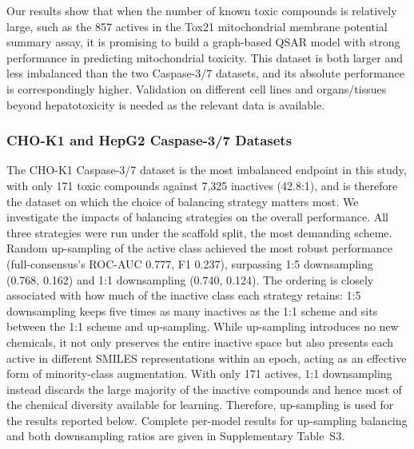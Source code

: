 \documentclass[letterpaper]{article}
\begin{document}
Our results show that when the number of known toxic compounds is relatively large, such as the 857 actives in the Tox21 mitochondrial membrane potential summary assay, it is promising to build a graph-based QSAR model with strong performance in predicting mitochondrial toxicity. This dataset is both larger and less imbalanced than the two Caspase-3/7 datasets, and its absolute performance is
correspondingly higher. Validation on different cell lines and organs/tissues beyond hepatotoxicity is needed as the relevant data is available.

\subsubsection*{CHO-K1 and HepG2 Caspase-3/7 Datasets}

The CHO-K1 Caspase-3/7 dataset is the most imbalanced endpoint in this study, with only 171 toxic compounds against 7,325 inactives (42.8:1), and is therefore the dataset on which the choice of balancing strategy matters most. We investigate the impacts of balancing strategies on the overall performance. All three strategies were run under the scaffold split, the most demanding scheme. Random up-sampling of the active class achieved the most robust performance (full-consensus's ROC-AUC 0.777, F1 0.237), surpassing 1:5
downsampling (0.768, 0.162) and 1:1 downsampling (0.740, 0.124). The ordering is closely associated with how much of the inactive class each strategy retains: 1:5 downsampling keeps five times as many inactives as the 1:1
scheme and sits between the 1:1 scheme and up-sampling. While up-sampling introduces no new chemicals, it not only preserves the entire inactive space but also presents each active in different SMILES representations within an epoch, acting as an effective form of
minority-class augmentation. With only 171 actives, 1:1 downsampling instead discards the large majority of the inactive compounds and hence most of the chemical diversity available for learning.
Therefore, up-sampling is used for the results reported below. Complete per-model results for up-sampling balancing and both downsampling ratios are given in Supplementary Table~S3.
\end{document}

